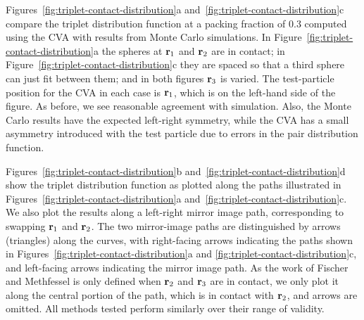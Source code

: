 Figures~\ref{fig:triplet-contact-distribution}a
and~\ref{fig:triplet-contact-distribution}c compare the triplet
distribution function at a packing fraction of 0.3 computed using the
CVA with results from Monte Carlo simulations. In
Figure~\ref{fig:triplet-contact-distribution}a the spheres at $\textbf{r}_1$
and $\textbf{r}_2$ are in contact; in
Figure~\ref{fig:triplet-contact-distribution}c they are spaced so that
a third sphere can just fit between them; and in both figures $\textbf{r}_3$
is varied. The test-particle position for the CVA in each case is
$\textbf{r}_1$, which is on the left-hand side of the figure. As before, we
see reasonable agreement with simulation. Also, the Monte Carlo
results have the expected left-right symmetry, while the CVA has a
small asymmetry introduced with the test particle due to errors in the
pair distribution function.

Figures~\ref{fig:triplet-contact-distribution}b
and~\ref{fig:triplet-contact-distribution}d show the triplet
distribution function as plotted along the paths illustrated in
Figures~\ref{fig:triplet-contact-distribution}a
and~\ref{fig:triplet-contact-distribution}c.  We also plot the
results along a left-right mirror image path, corresponding to
swapping $\textbf{r}_1$ and $\textbf{r}_2$. The two mirror-image paths are
distinguished by arrows (triangles) along the curves, with right-facing arrows
indicating the paths shown in
Figures~\ref{fig:triplet-contact-distribution}a and
\ref{fig:triplet-contact-distribution}c, and left-facing arrows
indicating the mirror image path.  As the work of
Fischer and Methfessel is only defined when $\textbf{r}_2$ and $\textbf{r}_3$ are in
contact, we only plot it along the
central portion of the path, which is in contact with $\textbf{r}_2$, and arrows
are omitted.
%
All methods tested perform similarly over their range of validity.

